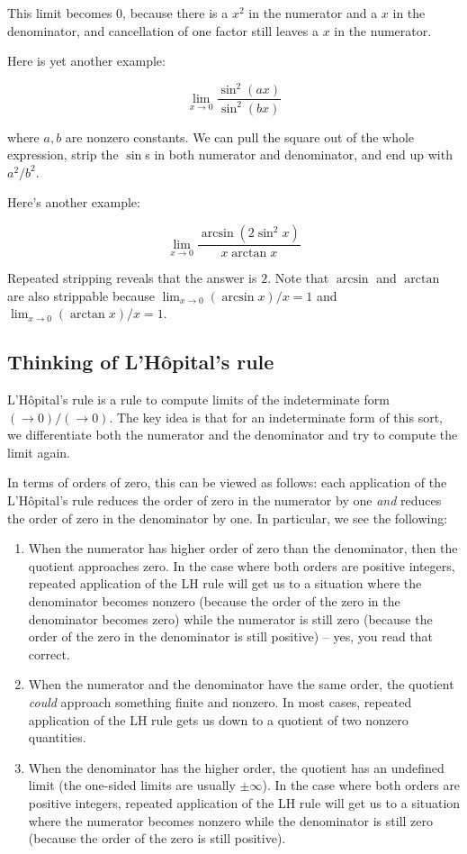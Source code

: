 \documentclass[10pt]{amsart}
\begin{document}
This limit becomes $0$, because there is a $x^2$ in the numerator and
a $x$ in the denominator, and cancellation of one factor still leaves
a $x$ in the numerator.

Here is yet another example:

$$\lim_{x \to 0} \frac{\sin^2(ax)}{\sin^2(bx)}$$

where $a,b$ are nonzero constants. We can pull the square out of the
whole expression, strip the $\sin$s in both numerator and denominator,
and end up with $a^2/b^2$.

Here's another example:

$$\lim_{x \to 0} \frac{\arcsin(2\sin^2x)}{x \arctan x}$$

Repeated stripping reveals that the answer is $2$. Note that $\arcsin$
and $\arctan$ are also strippable because $\lim_{x \to 0} (\arcsin
x)/x = 1$ and $\lim_{x \to 0} (\arctan x)/x = 1$.

\subsection{Thinking of L'H\^{o}pital's rule}

L'H\^{o}pital's rule is a rule to compute limits of the indeterminate
form $(\to 0)/(\to 0)$. The key idea is that for an indeterminate form
of this sort, we differentiate both the numerator and the denominator
and try to compute the limit again.

In terms of orders of zero, this can be viewed as follows: each
application of the L'H\^{o}pital's rule reduces the order of zero in
the numerator by one {\em and} reduces the order of zero in the
denominator by one. In particular, we see the following:

\begin{enumerate}
\item When the numerator has higher order of zero than the
  denominator, then the quotient approaches zero. In the case where
  both orders are positive integers, repeated application of the LH
  rule will get us to a situation where the denominator becomes
  nonzero (because the order of the zero in the denominator becomes
  zero) while the numerator is still zero (because the order of the
  zero in the denominator is still positive) -- yes, you read that
  correct.
\item When the numerator and the denominator have the same order, the
  quotient {\em could} approach something finite and nonzero. In most
  cases, repeated application of the LH rule gets us down to a
  quotient of two nonzero quantities.
\item When the denominator has the higher order, the quotient has an
  undefined limit (the one-sided limits are usually $\pm \infty$). In
  the case where both orders are positive integers, repeated
  application of the LH rule will get us to a situation where the
  numerator becomes nonzero while the denominator is still zero
  (because the order of the zero is still positive).
\end{enumerate}
\end{document}
